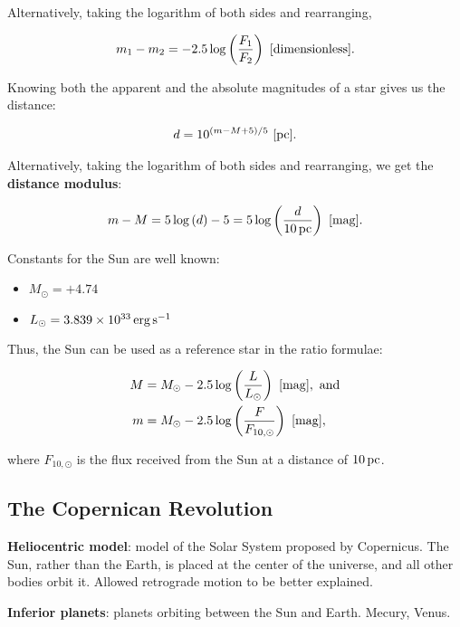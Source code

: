 \documentclass[a4paper,10pt]{article}
\begin{document}
Alternatively, taking the logarithm of both sides and rearranging, 

\begin{align*}
    m_1 - m_2 = -2.5\log\left(\frac{F_1}{F_2}\right)~[{\rm dimensionless}].
\end{align*}

Knowing both the apparent and the absolute magnitudes of a star gives us the distance:

\begin{align*}
    d = 10^{(m-M+5)/5}~[{\rm pc}].
\end{align*}

Alternatively, taking the logarithm of both sides and rearranging, we get the \textbf{distance modulus}: 

\begin{align*}
    m-M = 5\log\left(d\right)-5 = 5\log\left({\frac{d}{10\,{\rm pc}}}\right)~[{\rm mag}].
\end{align*}

Constants for the Sun are well known:
\begin{itemize}
    \item $M_\odot = +4.74$
    \item $L_\odot= 3.839\times 10^{33}\,{\rm erg\,s^{-1}}$
\end{itemize}

Thus, the Sun can be used as a reference star in the ratio formulae: 

\begin{align*}
    M &= M_\odot - 2.5\log\left(\frac{L}{L_\odot}\right)~[{\rm mag}],~{\rm and }\\
    m &= M_\odot - 2.5\log\left(\frac{F}{F_{10, \odot}}\right)~[{\rm mag}],
\end{align*}

where $F_{10, \odot}$ is the flux received from the Sun at a distance of $10\,{\rm pc}$.

\subsection{The Copernican Revolution}

\textbf{Heliocentric model}: model of the Solar System proposed by Copernicus. The Sun, rather than the Earth, is placed at the center of the universe, and all other bodies orbit it. Allowed retrograde motion to be better explained. 

\textbf{Inferior planets}: planets orbiting between the Sun and Earth. Mecury, Venus.  
\end{document}

